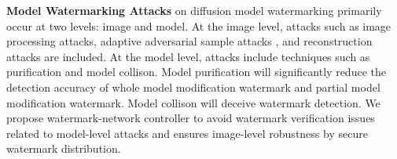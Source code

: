 






\noindent\textbf{Model Watermarking Attacks}
on diffusion model watermarking primarily occur at two levels: image and model. At the image level, attacks such as image processing attacks, adaptive adversarial sample attacks \cite{jiang2023evading}, and reconstruction attacks \cite{zhao2023invisible} are included. At the model level, attacks include techniques such as purification and model collison. 
Model purification will significantly reduce the detection accuracy of whole model modification watermark and partial model modification watermark. Model collison  will deceive watermark detection.
We propose watermark-network controller to avoid watermark verification issues related to model-level attacks and ensures image-level robustness by secure watermark distribution.